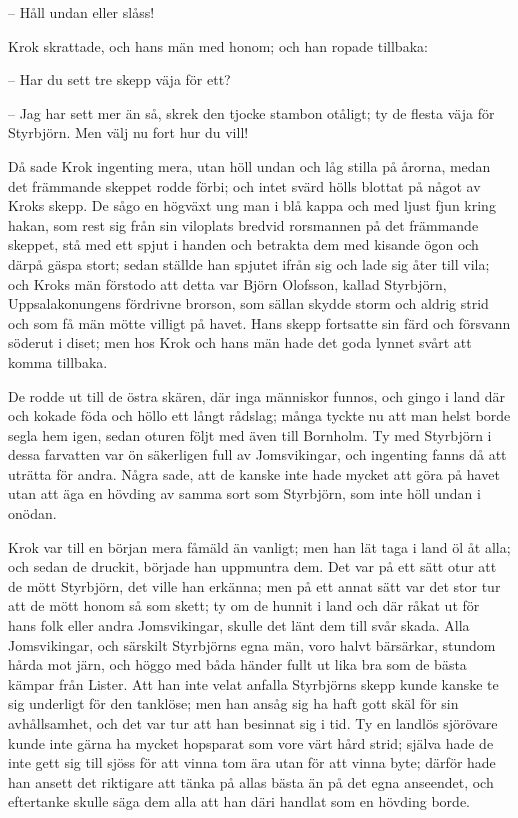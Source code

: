 – Håll undan eller slåss!

Krok skrattade, och hans män med honom; och han ropade tillbaka:

– Har du sett tre skepp väja för ett?

– Jag har sett mer än så, skrek den tjocke stambon otåligt; ty de flesta väja för Styrbjörn. Men välj nu fort hur du vill!

\initial Då sade Krok ingenting mera, utan höll undan och låg stilla på årorna, medan det främmande skeppet rodde förbi; och intet svärd hölls blottat på något av Kroks skepp. De sågo en högväxt ung man i blå kappa och med ljust fjun kring hakan, som rest sig från sin viloplats bredvid rorsmannen på det främmande skeppet, stå med ett spjut i handen och betrakta dem med kisande ögon och därpå gäspa stort; sedan ställde han spjutet ifrån sig och lade sig åter till vila; och Kroks män förstodo att detta var Björn Olofsson, kallad Styrbjörn, Uppsalakonungens fördrivne brorson, som sällan skydde storm och aldrig strid och som få män mötte villigt på havet. Hans skepp fortsatte sin färd och försvann söderut i diset; men hos Krok och hans män hade det goda lynnet svårt att komma tillbaka.

\initial De rodde ut till de östra skären, där inga människor funnos, och gingo i land där och kokade föda och höllo ett långt rådslag; många tyckte nu att man helst borde segla hem igen, sedan oturen följt med även till Bornholm. Ty med Styrbjörn i dessa farvatten var ön säkerligen full av Jomsvikingar, och ingenting fanns då att uträtta för andra. Några sade, att de kanske inte hade mycket att göra på havet utan att äga en hövding av samma sort som Styrbjörn, som inte höll undan i onödan.

\initial Krok var till en början mera fåmäld än vanligt; men han lät taga i land öl åt alla; och sedan de druckit, började han uppmuntra dem. Det var på ett sätt otur att de mött Styrbjörn, det ville han erkänna; men på ett annat sätt var det stor tur att de mött honom så som skett; ty om de hunnit i land och där råkat ut för hans folk eller andra Jomsvikingar, skulle det länt dem till svår skada. Alla Jomsvikingar, och särskilt Styrbjörns egna män, voro halvt bärsärkar, stundom hårda mot järn, och höggo med båda händer fullt ut lika bra som de bästa kämpar från Lister. Att han inte velat anfalla Styrbjörns skepp kunde kanske te sig underligt för den tanklöse; men han ansåg sig ha haft gott skäl för sin avhållsamhet, och det var tur att han besinnat sig i tid. Ty en landlös sjörövare kunde inte gärna ha mycket hopsparat som vore värt hård strid; själva hade de inte gett sig till sjöss för att vinna tom ära utan för att vinna byte; därför hade han ansett det riktigare att tänka på allas bästa än på det egna anseendet, och eftertanke skulle säga dem alla att han däri handlat som en hövding borde.

